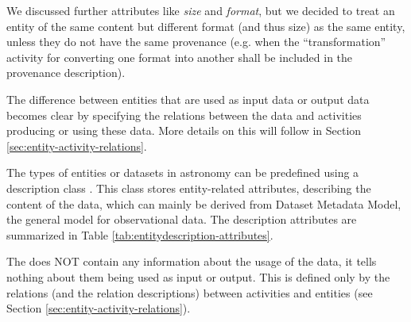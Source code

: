 We discussed further attributes like \emph{size} and \emph{format}, but we decided to treat an
entity of the same content but different format (and thus size) as the same entity,
unless they do not have the same provenance (e.g. when the ``transformation'' activity
for converting one format into another shall be included in the provenance description).


The difference between entities that are used as input data or output data 
becomes clear by specifying the relations between the data and activities producing or using these data.
More details on this will follow in Section \ref{sec:entity-activity-relations}.

The types of entities or datasets in astronomy can be predefined using a description
class .
This class stores entity-related 
attributes, describing the content of the data, which can mainly be derived from 
Dataset Metadata Model, the general model for observational data.
The description attributes are summarized in Table 
\ref{tab:entitydescription-attributes}.

The  does NOT contain any information about the usage 
of the data, it tells nothing about them being used as input or output. This is 
defined only by the relations (and the relation descriptions) between activities
and entities (see Section \ref{sec:entity-activity-relations}).


